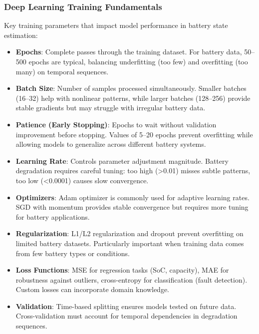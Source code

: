 \subsubsection{Deep Learning Training Fundamentals}
Key training parameters that impact model performance in battery state estimation:

\begin{itemize}
    \item \textbf{Epochs}: Complete passes through the training dataset. For battery data, 50--500 epochs are typical, balancing underfitting (too few) and overfitting (too many) on temporal sequences.

    \item \textbf{Batch Size}: Number of samples processed simultaneously. Smaller batches (16--32) help with nonlinear patterns, while larger batches (128--256) provide stable gradients but may struggle with irregular battery data.

    \item \textbf{Patience (Early Stopping)}: Epochs to wait without validation improvement before stopping. Values of 5--20 epochs prevent overfitting while allowing models to generalize across different battery systems.

    \item \textbf{Learning Rate}: Controls parameter adjustment magnitude. Battery degradation requires careful tuning: too high (>0.01) misses subtle patterns, too low (<0.0001) causes slow convergence.

    \item \textbf{Optimizers}: Adam optimizer is commonly used for adaptive learning rates. SGD with momentum provides stable convergence but requires more tuning for battery applications.

    \item \textbf{Regularization}: L1/L2 regularization and dropout prevent overfitting on limited battery datasets. Particularly important when training data comes from few battery types or conditions.

    \item \textbf{Loss Functions}: MSE for regression tasks (SoC, capacity), MAE for robustness against outliers, cross-entropy for classification (fault detection). Custom losses can incorporate domain knowledge.

    \item \textbf{Validation}: Time-based splitting ensures models tested on future data. Cross-validation must account for temporal dependencies in degradation sequences.
\end{itemize}



